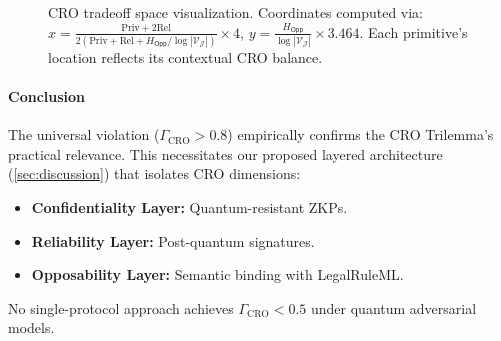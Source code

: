 \documentclass[preprint,12pt]{elsarticle}
\begin{document}
\begin{figure}[H]
                \caption{CRO tradeoff space visualization. Coordinates computed via:
                $x = \frac{\mathrm{Priv} + 2\mathrm{Rel}}{2(\mathrm{Priv}+\mathrm{Rel}+H_{\mathsf{Opp}}/\log|\mathcal{V_J}|)} \times 4$,
                $y = \frac{H_{\mathsf{Opp}}}{\log|\mathcal{V_J}|} \times 3.464$.
                Each primitive’s location reflects its contextual CRO balance.}
                \label{fig:cro_triangle}
            \end{figure}

            \paragraph{Conclusion}
                The universal violation ($\Gamma_{\text{CRO}} > 0.8$) empirically confirms the CRO Trilemma's practical relevance. This necessitates our proposed layered architecture (\ref{sec:discussion}) that isolates CRO dimensions:
                \begin{itemize}
                    \item \textbf{Confidentiality Layer:} Quantum-resistant ZKPs.
                    \item \textbf{Reliability Layer:} Post-quantum signatures.
                    \item \textbf{Opposability Layer:} Semantic binding with LegalRuleML.
                \end{itemize}
                No single-protocol approach achieves $\Gamma_{\text{CRO}} < 0.5$ under quantum adversarial models.
\end{document}
